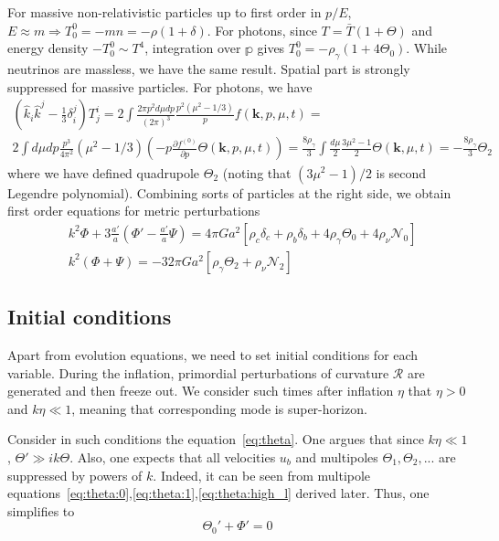 \documentclass[12pt]{extarticle}
\numberwithin{problem}{section}
\numberwithin{theorem}{section}
\begin{document}
	For massive non-relativistic particles up to first order in $p/E$, $E\approx m\Rightarrow T^0_0 = -mn = -\rho(1 + \delta)$. For photons, since $T = \bar{T}(1 + \Theta)$ and energy density $-T^0_0\sim T^4$, integration over $\mathbb{p}$ gives $T^0_0 = -\rho_\gamma(1 + 4\Theta_0)$. While neutrinos are massless, we have the same result. Spatial part is strongly suppressed for massive particles. For photons, we have
	\begin{multline}
		(\hat{k}_i\hat{k}^j - \frac{1}{3}\delta_i^j)T^i_j = 2\int\frac{2\pi p^2 d\mu dp}{(2\pi)^3}\frac{p^2(\mu^2 - 1/3)}{p}f(\mathbf{k}, p, \mu, t) =\\
		2\int d\mu dp\frac{p^3}{4\pi^2}(\mu^2 - 1/3)\left(-p\frac{\partial f^{(0)}}{\partial p}\Theta(\mathbf{k}, p, \mu, t)\right) = \frac{8\rho_\gamma}{3}\int \frac{d\mu}{2} \frac{3\mu^2 - 1}{2}\Theta(\mathbf{k}, \mu, t) = -\frac{8\rho_\gamma}{3}\Theta_2
	\end{multline}
	where we have defined quadrupole $\Theta_2$ (noting that $(3\mu^2 - 1) / 2$ is second Legendre polynomial). Combining sorts of particles at the right side, we obtain first order equations for metric perturbations
	\begin{align}
		\label{eq:phi}
		& k^2\Phi + 3\frac{a'}{a}\left(\Phi' - \frac{a'}{a}\Psi\right) = 4\pi Ga^2[\rho_c\delta_c + \rho_b\delta_b + 4\rho_\gamma\Theta_0 + 4\rho_\nu\mathcal{N}_0] \\
		\label{eq:psi}
		& k^2(\Phi + \Psi) = -32\pi Ga^2[\rho_\gamma\Theta_2 + \rho_\nu\mathcal{N}_2]
	\end{align}

	\subsection{Initial conditions}
	Apart from evolution equations, we need to set initial conditions for each variable. During the inflation, primordial perturbations of curvature $\mathcal{R}$ are generated and then freeze out. We consider such times after inflation $\eta$ that $\eta > 0$ and $k\eta\ll 1$, meaning that corresponding mode is super-horizon. 
	
	Consider in such conditions the equation~\ref{eq:theta}. One argues that since $k\eta\ll 1$, $\Theta'\gg ik\Theta$. Also, one expects that all velocities $u_b$ and multipoles $\Theta_1, \Theta_2, ...$ are suppressed by powers of $k$. Indeed, it can be seen from multipole equations~\ref{eq:theta:0},\ref{eq:theta:1},\ref{eq:theta:high_l} derived later. Thus, one simplifies to
	\begin{equation}
		\label{eq:theta:super-horizon}
		\Theta_0' + \Phi' = 0
	\end{equation}
\end{document}
